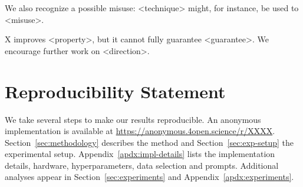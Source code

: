 We also recognize a possible misuse: <technique> might, for instance, be used to <misuse>.

X improves <property>, but it cannot fully guarantee <guarantee>. We encourage further work on <direction>.

\section*{Reproducibility Statement}
We take several steps to make our results reproducible. An anonymous implementation is available at \url{https://anonymous.4open.science/r/XXXX}. Section~\ref{sec:methodology} describes the method and Section~\ref{sec:exp-setup} the experimental setup. Appendix~\ref{apdx:impl-details} lists the implementation details, hardware, hyperparameters, data selection and prompts. Additional analyses appear in Section~\ref{sec:experiments} and Appendix~\ref{apdx:experiments}.
